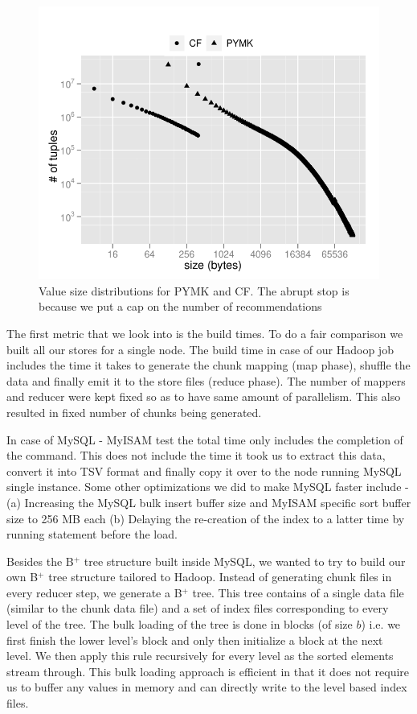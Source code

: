\begin{figure}
  \centering
    \includegraphics[scale=0.55]{images/data_distribution.pdf}
  \caption{Value size distributions for PYMK and CF. The abrupt stop is because we put a cap on the number of recommendations}
  \label{distribution}
\end{figure}

The first metric that we look into is the build times. To do a fair
comparison we built all our stores for a single node. The build time
in case of our Hadoop job includes the time it takes to generate the
chunk mapping (map phase), shuffle the data and finally emit it to the
store files (reduce phase). The number of mappers and reducer were
kept fixed so as to have same amount of parallelism. This also
resulted in fixed number of chunks being generated.

In case of MySQL - MyISAM test the total time only includes the
completion of the  command. This does not
include the time it took us to extract this data, convert it into TSV
format and finally copy it over to the node running MySQL single
instance. Some other optimizations we did to make MySQL faster include
- (a) Increasing the MySQL bulk insert buffer size and MyISAM specific
sort buffer size to 256 MB each (b) Delaying the re-creation of the
index to a latter time by running 
statement before the load. 

Besides the B$^{+}$ tree structure built inside MySQL, we wanted to
try to build our own B$^{+}$ tree structure tailored to Hadoop.
Instead of generating chunk files in every reducer step, we generate a
B$^{+}$ tree. This tree contains of a single data file (similar to the
chunk data file) and a set of index files corresponding to every level
of the tree. The bulk loading of the tree is done in blocks (of size
$b$) i.e. we first finish the lower level's block and only then
initialize a block at the next level. We then apply this rule
recursively for every level as the sorted elements stream through.
This bulk loading approach is efficient in that it does not require us
to buffer any values in memory and can directly write to the level
based index files. 

